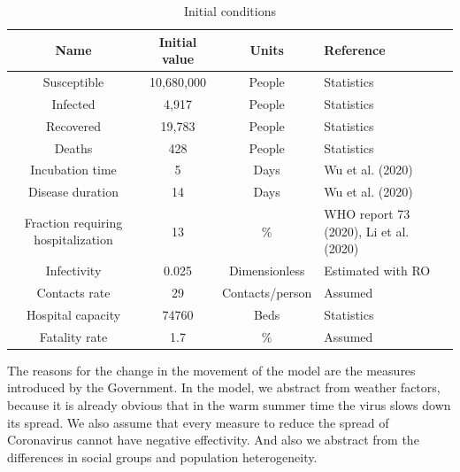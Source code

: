 \documentclass[12pt,a4paper,english]{article}
\begin{document}
    \begin{table}[h!]
        \centering
        \begin{tabularx}{\textwidth}{|c|c|c|X|}
            \hline
            Name & Initial value & Units & Reference \\
            \hline
            Susceptible	                        & 10,680,000 &	People & Statistics \\
            Infected                            & 4,917 &	People & Statistics \\
            Recovered                           & 19,783 &	People & Statistics \\
            Deaths                              & 428 &	People & Statistics \\
            Incubation time	                    & 5	 &  Days & Wu et al. (2020)\\
            Disease duration                    & 14	&  Days & Wu et al. (2020)\\
            Fraction requiring hospitalization	& 13  & \% & WHO report 73 (2020), Li et al. (2020) \\
            Infectivity	                        & 0.025 & Dimensionless & Estimated with RO \\
            Contacts rate	                    & 29   & Contacts/person & Assumed \\
            Hospital capacity	                & 74760 & Beds & Statistics \\
            Fatality rate	                    & 1.7	   & \% & Assumed \\
            \hline
        \end{tabularx}
        \caption{Initial conditions}
        \label{tab:init_vars2}
    \end{table}

    \newpage
    The reasons for the change in the movement of the model are the measures introduced by the Government. 
    In the model, we abstract from weather factors, because it is already obvious that in the warm summer time the virus slows down its spread.
    We also assume that every measure to reduce the spread of Coronavirus cannot have negative effectivity. 
    And also we abstract from the differences in social groups and population heterogeneity.
    
\end{document}
